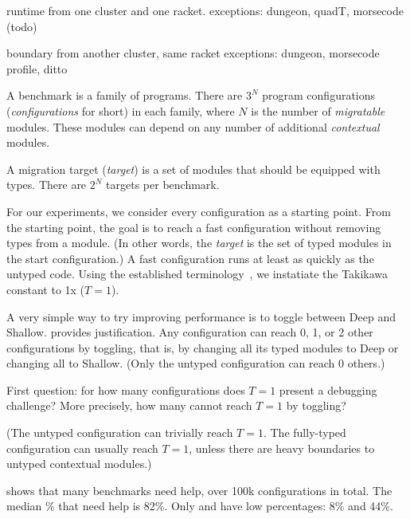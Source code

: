 
runtime from one cluster and one racket.
exceptions: dungeon, quadT, morsecode (todo)

boundary from another cluster, same racket
exceptions: dungeon, morsecode
profile, ditto


A benchmark is a family of programs.
There are $3^N$ program configurations (\emph{configurations} for short)
in each family, where $N$ is the number of \emph{migratable} modules.
These modules can depend on any number of additional \emph{contextual} modules.

A migration target (\emph{target}) is a set of modules that should be equipped
with types.
There are $2^N$ targets per benchmark.

For our experiments, we consider every configuration as a starting point.
From the starting point, the goal is to reach a fast configuration without
removing types from a module.
(In other words, the \emph{target} is the set of typed modules in the start
configuration.)
A fast configuration runs at least as quickly as the untyped code.
Using the established terminology~\cite{vss-popl-2017,bbst-oopsla-2017},
we instatiate the Takikawa constant to 1x ($T=1$).

A very simple way to try improving performance is to toggle between
Deep and Shallow.
\citet{g-pldi-2022} provides justification.
Any configuration can reach 0, 1, or 2 other configurations by
toggling, that is, by changing all its typed modules to Deep or
changing all to Shallow.
(Only the untyped configuration can reach 0 others.)

First question: for how many configurations does $T=1$ present a debugging challenge?
More precisely, how many cannot reach $T=1$ by toggling?

(The untyped configuration can trivially reach $T=1$.
The fully-typed configuration can usually reach $T=1$, unless there are heavy
boundaries to untyped contextual modules.)

 shows that many benchmarks need help,
over 100k configurations in total.
The median \% that need help is 82\%.
Only  and  have low percentages: 8\% and 44\%.

